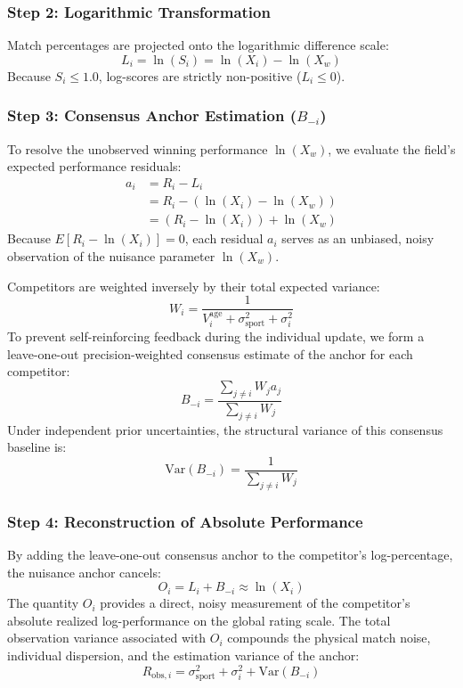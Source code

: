 \documentclass[12pt]{article}
\newcommand{\sigmai}{\sigma_i^2}
\newcommand{\ssport}{\sigma_{\mathrm{sport}}^2}      %
\newcommand{\xwin}{X_w}
\begin{document}
	\subsubsection*{Step 2: Logarithmic Transformation}
	Match percentages are projected onto the logarithmic difference scale:
	\begin{equation}
		L_i = \ln(S_i) = \ln(X_i) - \ln(\xwin)
	\end{equation}
	Because $S_i \le 1.0$, log-scores are strictly non-positive ($L_i \le 0$).
	
	\subsubsection*{Step 3: Consensus Anchor Estimation ($B_{-i}$)}
	To resolve the unobserved winning performance $\ln(\xwin)$, we evaluate the field's expected performance residuals:
	\begin{align}
		a_i &= R_i - L_i \nonumber \\
		&= R_i - (\ln(X_i) - \ln(\xwin)) \nonumber \\
		&= (R_i - \ln(X_i)) + \ln(\xwin)
	\end{align}
	Because $E[R_i - \ln(X_i)] = 0$, each residual $a_i$ serves as an unbiased, noisy observation of the nuisance parameter $\ln(\xwin)$. 
	
	Competitors are weighted inversely by their total expected variance:
	\begin{equation}
		W_i = \frac{1}{V_i^{\mathrm{age}} + \ssport + \sigmai}
	\end{equation}
	To prevent self-reinforcing feedback during the individual update, we form a leave-one-out precision-weighted consensus estimate of the anchor for each competitor:
	\begin{equation}
		B_{-i} = \frac{\sum_{j \neq i} W_j a_j}{\sum_{j \neq i} W_j}
	\end{equation}
	Under independent prior uncertainties, the structural variance of this consensus baseline is:
	\begin{equation}
		\mathrm{Var}(B_{-i}) = \frac{1}{\sum_{j \neq i} W_j}
	\end{equation}
	
	\subsubsection*{Step 4: Reconstruction of Absolute Performance}
	By adding the leave-one-out consensus anchor to the competitor's log-percentage, the nuisance anchor cancels:
	\begin{equation}
		O_i = L_i + B_{-i} \approx \ln(X_i)
	\end{equation}
	The quantity $O_i$ provides a direct, noisy measurement of the competitor's absolute realized log-performance on the global rating scale. The total observation variance associated with $O_i$ compounds the physical match noise, individual dispersion, and the estimation variance of the anchor:
	\begin{equation}
		R_{\mathrm{obs},i} = \ssport + \sigmai + \mathrm{Var}(B_{-i})
	\end{equation}
	
\end{document}
